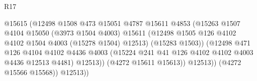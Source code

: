 \begin{lexlean}{R17}
\begin{coremodule}
                                              @15615
                                              (@12498
                                                @1508
                                                @473
                                                @15051
                                                @4787
                                                @15611
                                                @4853
                                                (@15263
                                                  @1507
                                                  @4104
                                                  @15050
                                                  (@3973 @1504 @4003)
                                                  @15611
                                                  (@12498
                                                    @1505
                                                    @126
                                                    @4102
                                                    @4102
                                                    @1504
                                                    @4003
                                                    (@15278 @1504)
                                                    @12513)
                                                  (@15283 @1503))
                                                (@12498
                                                  @471
                                                  @126
                                                  @4104
                                                  @4102
                                                  @4436
                                                  @4003
                                                  (@15224
                                                    @241
                                                    @41
                                                    @126
                                                    @4102
                                                    @4102
                                                    @4003
                                                    @4436
                                                    @12513
                                                    @4481)
                                                  @12513))
                                              (@4272 @15611 @15613))
                                            @12513))
                                        (@4272 @15566 @15568))
                                      @12513))

\end{coremodule}
\end{lexlean}
